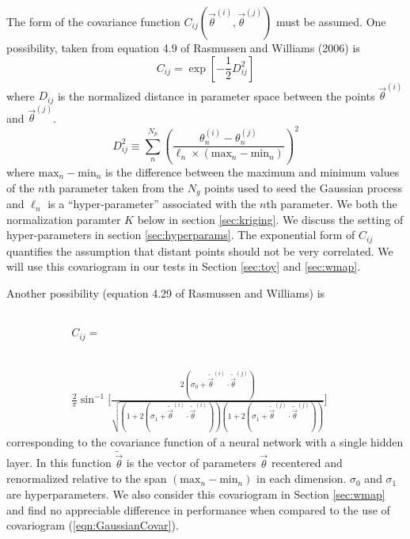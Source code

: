 \documentclass[useAMS,usenatbib]{aastex}
\begin{document}
The form of the covariance function 
$C_{ij}(\vec{\theta}^{(i)},\vec{\theta}^{(j)})$ must be
assumed.  One possibility, 
taken from equation 4.9 of Rasmussen and Williams (2006) is
\begin{equation}
\label{eqn:GaussianCovar}
C_{ij}=\exp\left[-\frac{1}{2}D^2_{ij}\right]
\end{equation}
where $D_{ij}$ is the normalized distance in parameter space between the points 
$\vec{\theta}^{(i)}$
and $\vec{\theta}^{(j)}$.
\begin{equation}
D^2_{ij}\equiv\sum_n^{N_p}
\left(\frac{\theta^{(i)}_n-\theta^{(j)}_n}{\ell_n\times(\text{max}_n-\text{min}_n)}\right)^2
\end{equation}
where $\text{max}_n-\text{min}_n$ is the difference between the maximum and minimum values of
the $n$th parameter taken from the $N_g$ points used to seed the Gaussian process and $\ell_n$
is a ``hyper-parameter'' associated with the $n$th parameter.  We both the normalization
paramter $K$ below in section \ref{sec:kriging}.  We discuss the setting of
hyper-parameters in section \ref{sec:hyperparams}.
The exponential form of $C_{ij}$ quantifies the assumption 
that distant points should
not be very correlated.  We will use this covariogram in
our tests in Section \ref{sec:toy} and \ref{sec:wmap}.

Another possibility (equation 4.29 of Rasmussen and Williams) is
\begin{eqnarray}
C_{ij}=\phantom{\sin
\bigg[\frac{2(\sigma_0+\tilde{\vec{\theta}}^{(i)}\cdot\tilde{\vec{\theta}}^{(j)})}
{\sqrt{(1+2(\sigma_1+\tilde{\vec{\theta}}^{(i)}\cdot\tilde{\vec{\theta}}^{(i)}))
(1+2(\sigma_1+\tilde{\vec{\theta}}^{(j)}\cdot\tilde{\vec{\theta}}^{(j)}))}}\bigg]}
\label{eqn:NNCovar}\\
\frac{2}{\pi}\sin^{-1}
\bigg[\frac{2(\sigma_0+\tilde{\vec{\theta}}^{(i)}\cdot\tilde{\vec{\theta}}^{(j)})}
{\sqrt{(1+2(\sigma_1+\tilde{\vec{\theta}}^{(i)}\cdot\tilde{\vec{\theta}}^{(i)}))
(1+2(\sigma_1+\tilde{\vec{\theta}}^{(j)}\cdot\tilde{\vec{\theta}}^{(j)}))}}\bigg]
\nonumber
\end{eqnarray}
corresponding to the covariance function of a neural network with a single
hidden layer.  In this function $\tilde{\vec{\theta}}$ is the vector of
parameters $\vec{\theta}$ recentered and renormalized relative to the span
$(\text{max}_n-\text{min}_n)$ in each dimension.  $\sigma_0$ and $\sigma_1$
are hyperparameters.  We also consider this
covariogram in Section \ref{sec:wmap} and find no appreciable difference
in performance when compared to the use of covariogram (\ref{eqn:GaussianCovar}).
\end{document}
